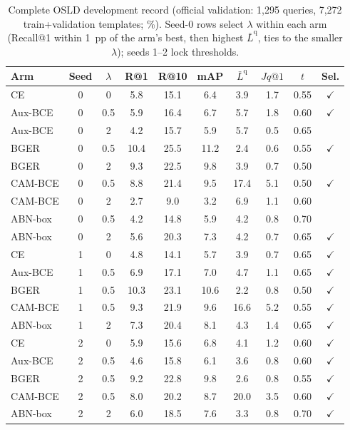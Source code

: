 \begin{table}[t]
\centering\footnotesize\setlength{\tabcolsep}{2.5pt}
\caption{Complete OSLD development record (official validation: 1,295 queries, 7,272 train+validation templates; \%). Seed-0 rows select $\lambda$ within each arm (Recall@1 within 1~pp of the arm's best, then highest $\bar L^{\mathrm q}$, ties to the smaller $\lambda$); seeds 1--2 lock thresholds.}
\label{tab:osld-dev}
\begin{tabular}{lccccccccc}
\toprule
Arm & Seed & $\lambda$ & R@1 & R@10 & mAP & $\bar L^{\mathrm q}$ & $Jq@1$ & $t$ & Sel.\\
\midrule
CE & 0 & 0 & 5.8 & 15.1 & 6.4 & 3.9 & 1.7 & 0.55 & $\checkmark$\\
Aux-BCE & 0 & 0.5 & 5.9 & 16.4 & 6.7 & 5.7 & 1.8 & 0.60 & $\checkmark$\\
Aux-BCE & 0 & 2 & 4.2 & 15.7 & 5.9 & 5.7 & 0.5 & 0.65 & \\
BGER & 0 & 0.5 & 10.4 & 25.5 & 11.2 & 2.4 & 0.6 & 0.55 & $\checkmark$\\
BGER & 0 & 2 & 9.3 & 22.5 & 9.8 & 3.9 & 0.7 & 0.50 & \\
CAM-BCE & 0 & 0.5 & 8.8 & 21.4 & 9.5 & 17.4 & 5.1 & 0.50 & $\checkmark$\\
CAM-BCE & 0 & 2 & 2.7 & 9.0 & 3.2 & 6.9 & 1.1 & 0.60 & \\
ABN-box & 0 & 0.5 & 4.2 & 14.8 & 5.9 & 4.2 & 0.8 & 0.70 & \\
ABN-box & 0 & 2 & 5.6 & 20.3 & 7.3 & 4.2 & 0.7 & 0.65 & $\checkmark$\\
CE & 1 & 0 & 4.8 & 14.1 & 5.7 & 3.9 & 0.7 & 0.65 & $\checkmark$\\
Aux-BCE & 1 & 0.5 & 6.9 & 17.1 & 7.0 & 4.7 & 1.1 & 0.65 & $\checkmark$\\
BGER & 1 & 0.5 & 10.3 & 23.1 & 10.6 & 2.2 & 0.8 & 0.50 & $\checkmark$\\
CAM-BCE & 1 & 0.5 & 9.3 & 21.9 & 9.6 & 16.6 & 5.2 & 0.55 & $\checkmark$\\
ABN-box & 1 & 2 & 7.3 & 20.4 & 8.1 & 4.3 & 1.4 & 0.65 & $\checkmark$\\
CE & 2 & 0 & 5.9 & 15.6 & 6.8 & 4.1 & 1.2 & 0.60 & $\checkmark$\\
Aux-BCE & 2 & 0.5 & 4.6 & 15.8 & 6.1 & 3.6 & 0.8 & 0.60 & $\checkmark$\\
BGER & 2 & 0.5 & 9.2 & 22.8 & 9.8 & 2.6 & 0.8 & 0.55 & $\checkmark$\\
CAM-BCE & 2 & 0.5 & 8.0 & 20.2 & 8.7 & 20.0 & 3.5 & 0.60 & $\checkmark$\\
ABN-box & 2 & 2 & 6.0 & 18.5 & 7.6 & 3.3 & 0.8 & 0.70 & $\checkmark$\\
\bottomrule
\end{tabular}
\end{table}
